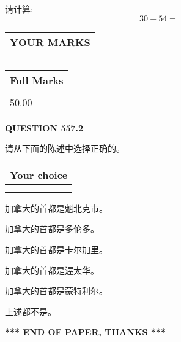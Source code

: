 \documentclass{ctexart}
\begin{document}
  
 
请计算:
\begin{equation}
30 +  %
54 = \nonumber
\end{equation}
 

 

 
  
\vspace{0.2in}
  
\noindent\begin{tabular}{|l|}
\hline
 YOUR MARKS  \\
\hline
 \\ 
 \\ 
\hline
\end{tabular}
\hspace{0.05in} \begin{tabular}{|l|}
\hline
 Full Marks  \\
\hline
 \\ 
50.00 \\
\hline
\end{tabular}
{\textbf{\Large{QUESTION
557.2 
}}}
  
  
请从下面的陈述中选择正确的。
  
  
\noindent\hspace{3.0in} \begin{tabular}{|l|}
\hline
Your choice \\
\hline
 \\ 
 \\ 
\hline
\end{tabular}
  
  
 
 
加拿大的首都是魁北克市。
 
 
加拿大的首都是多伦多。
 
 
加拿大的首都是卡尔加里。
 
 
加拿大的首都是渥太华。
 
 
加拿大的首都是蒙特利尔。
 
 
 上述都不是。
 
 
   
   
 \vspace{0.2in}
 
   
   
   
   
\vspace{1.0in} 
{\textbf{\large{ *** END OF PAPER, THANKS *** }}} 
   
\end{document}
